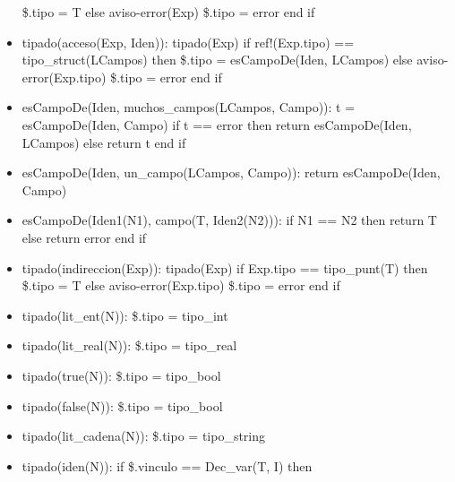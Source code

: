 \documentclass[11pt]{article}
\begin{document}
\begin{itemize}
                    \subsubitem \$.tipo = T
                \subitem else 
                    \subsubitem aviso-error(Exp)
                    \subsubitem \$.tipo = error
                \subitem end if
            \item tipado(acceso(Exp, Iden)): 
                \subitem tipado(Exp) 
                \subitem if ref!(Exp.tipo) == tipo\_struct(LCampos) then
                    \subsubitem \$.tipo = esCampoDe(Iden, LCampos)
                \subitem else 
                    \subsubitem aviso-error(Exp.tipo)
                    \subsubitem \$.tipo = error
                \subitem end if
            \item esCampoDe(Iden, muchos\_campos(LCampos, Campo)): 
                \subitem t = esCampoDe(Iden, Campo) 
                \subitem if t == error then
                    \subsubitem return esCampoDe(Iden, LCampos)
                \subitem else 
                    \subsubitem return t
                \subitem end if
            \item esCampoDe(Iden, un\_campo(LCampos, Campo)): 
                \subitem return esCampoDe(Iden, Campo)
            \item esCampoDe(Iden1(N1), campo(T, Iden2(N2))): 
                \subitem if N1 == N2 then
                    \subsubitem return T
                \subitem else 
                    \subsubitem return error
                \subitem end if
            \item tipado(indireccion(Exp)): 
                \subitem tipado(Exp) 
                \subitem if Exp.tipo == tipo\_punt(T) then
                    \subsubitem \$.tipo = T
                \subitem else 
                    \subsubitem aviso-error(Exp.tipo)
                    \subsubitem \$.tipo = error
                \subitem end if
            \item tipado(lit\_ent(N)): 
                \subitem \$.tipo = tipo\_int
            \item tipado(lit\_real(N)): 
                \subitem \$.tipo = tipo\_real
            \item tipado(true(N)): 
                \subitem \$.tipo = tipo\_bool
            \item tipado(false(N)): 
                \subitem \$.tipo = tipo\_bool
            \item tipado(lit\_cadena(N)): 
                \subitem \$.tipo = tipo\_string
            \item tipado(iden(N)): 
                \subitem if \$.vinculo == Dec\_var(T, I) then

\end{itemize}
\end{document}
